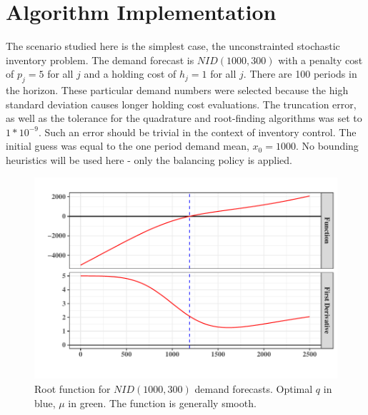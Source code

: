 \documentclass[12pt]{article}
\begin{document}
\section{Algorithm Implementation}

The scenario studied here is the simplest case, the unconstrainted stochastic inventory problem. The demand forecast is $NID(1000, 300)$ with a penalty cost of $p_j = 5$ for all $j$ and a holding cost of $h_j = 1$ for all $j$. There are 100 periods in the horizon. These particular demand numbers were selected because the high standard deviation causes longer holding cost evaluations. The truncation error, as well as the tolerance for the quadrature and root-finding algorithms was set to $1*10^{-9}$. Such an error should be trivial in the context of inventory control. The initial guess was equal to the one period demand mean, $x_0 = 1000$. No bounding heuristics will be used here - only the balancing policy is applied. \\
\begin{figure}
\includegraphics[width=\textwidth]{root_function_report}
\caption{Root function for $NID(1000, 300)$ demand forecasts. Optimal $q$ in blue, $\mu$ in green. The function is generally smooth.}
\end{figure}
\end{document}
